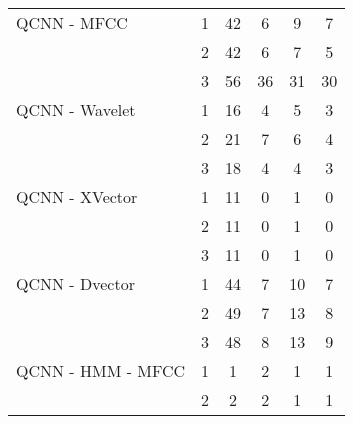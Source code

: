 \documentclass[conference]{IEEEtran}
\begin{document}
\begin{table*}[htbp]
\begin{tabular}{|l|c|c|c|c|c|}
        QCNN - MFCC          & 1             & 42                     & 6                       & 9                    & 7                      \\
                             & 2             & 42                     & 6                       & 7                    & 5                      \\
                             & 3             & 56                     & 36                      & 31                   & 30                     \\
        QCNN - Wavelet       & 1             & 16                     & 4                       & 5                    & 3                      \\
                             & 2             & 21                     & 7                       & 6                    & 4                      \\
                             & 3             & 18                     & 4                       & 4                    & 3                      \\
        QCNN - XVector       & 1             & 11                     & 0                       & 1                    & 0                      \\
                             & 2             & 11                     & 0                       & 1                    & 0                      \\
                             & 3             & 11                     & 0                       & 1                    & 0                      \\
        QCNN - Dvector       & 1             & 44                     & 7                       & 10                   & 7                      \\
                             & 2             & 49                     & 7                       & 13                   & 8                      \\
                             & 3             & 48                     & 8                       & 13                   & 9                      \\
        QCNN - HMM - MFCC    & 1             & 1                      & 2                       & 1                    & 1                      \\
                             & 2             & 2                      & 2                       & 1                    & 1                      \\

\end{tabular}
\end{table*}
\end{document}
